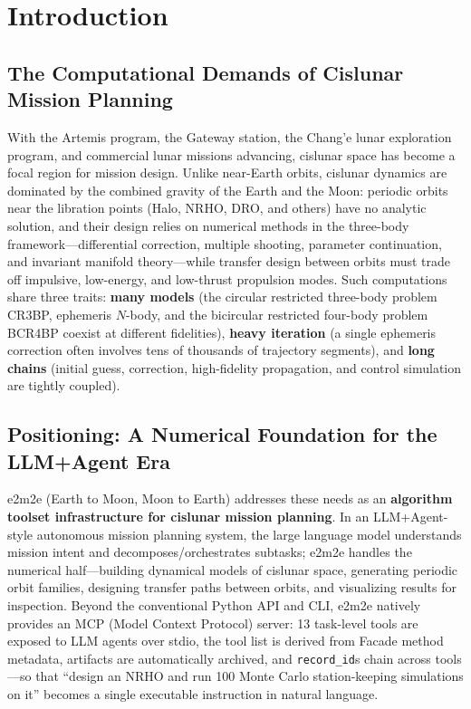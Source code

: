 \section{Introduction}

\subsection{The Computational Demands of Cislunar Mission Planning}

With the Artemis program, the Gateway station, the Chang'e lunar exploration
program, and commercial lunar missions advancing, cislunar space has become a
focal region for mission design. Unlike near-Earth orbits, cislunar dynamics
are dominated by the combined gravity of the Earth and the Moon: periodic
orbits near the libration points (Halo, NRHO, DRO, and others) have no
analytic solution, and their design relies on numerical methods in the
three-body framework---differential correction, multiple shooting, parameter
continuation, and invariant manifold theory---while transfer design between
orbits must trade off impulsive, low-energy, and low-thrust propulsion modes.
Such computations share three traits: \textbf{many models} (the circular
restricted three-body problem CR3BP, ephemeris $N$-body, and the bicircular
restricted four-body problem BCR4BP coexist at different fidelities),
\textbf{heavy iteration} (a single ephemeris correction often involves tens
of thousands of trajectory segments), and \textbf{long chains} (initial
guess, correction, high-fidelity propagation, and control simulation are
tightly coupled).

\subsection{Positioning: A Numerical Foundation for the LLM+Agent Era}

e2m2e (Earth to Moon, Moon to Earth) addresses these needs as an
\textbf{algorithm toolset infrastructure for cislunar mission planning}. In
an LLM+Agent-style autonomous mission planning system, the large language
model understands mission intent and decomposes/orchestrates subtasks; e2m2e
handles the numerical half---building dynamical models of cislunar space,
generating periodic orbit families, designing transfer paths between orbits,
and visualizing results for inspection. Beyond the conventional Python API
and CLI, e2m2e natively provides an MCP (Model Context Protocol) server: 13
task-level tools are exposed to LLM agents over stdio, the tool list is
derived from Facade method metadata, artifacts are automatically archived,
and \texttt{record\_id}s chain across tools---so that ``design an NRHO and
run 100 Monte Carlo station-keeping simulations on it'' becomes a single
executable instruction in natural language.

